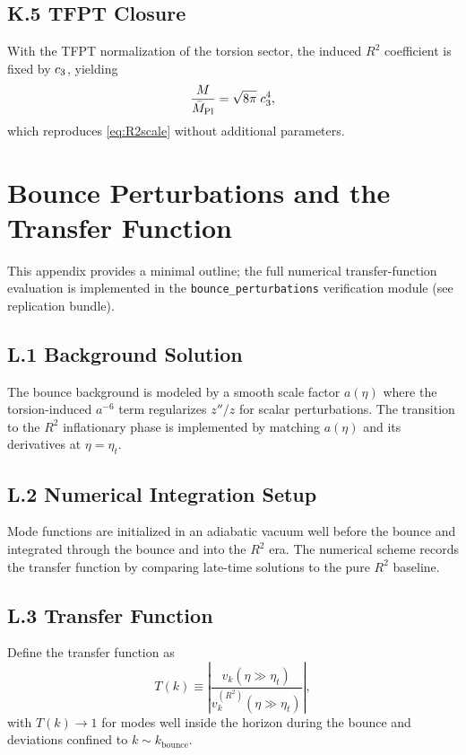 \subsection{K.5 TFPT Closure}
With the TFPT normalization of the torsion sector, the induced $R^2$ coefficient is fixed by
$c_3$, yielding
\begin{equation}
    \frac{M}{\bar{M}_{\mathrm{Pl}}}=\sqrt{8\pi}\;c_3^4,
\end{equation}
which reproduces \eqref{eq:R2scale} without additional parameters.

\section{Bounce Perturbations and the Transfer Function}
\label{app:bounce}

\begin{tcolorbox}[colback=gray!5, colframe=gray!60, 
    title={\textbf{Status Note}}, fonttitle=\bfseries\small]
This appendix provides a minimal outline; the full numerical transfer-function evaluation
is implemented in the \texttt{bounce\_perturbations} verification module (see replication bundle).
\end{tcolorbox}

\subsection{L.1 Background Solution}
The bounce background is modeled by a smooth scale factor $a(\eta)$ where the torsion-induced
$a^{-6}$ term regularizes $z''/z$ for scalar perturbations. The transition to the $R^2$
inflationary phase is implemented by matching $a(\eta)$ and its derivatives at $\eta=\eta_t$.

\subsection{L.2 Numerical Integration Setup}
Mode functions are initialized in an adiabatic vacuum well before the bounce and integrated
through the bounce and into the $R^2$ era. The numerical scheme records the transfer function
by comparing late-time solutions to the pure $R^2$ baseline.

\subsection{L.3 Transfer Function}
Define the transfer function as
\begin{equation}
    T(k) \equiv \left|\frac{v_k(\eta\gg \eta_t)}{v_k^{(R^2)}(\eta\gg \eta_t)}\right|,
\end{equation}
with $T(k)\to 1$ for modes well inside the horizon during the bounce and deviations confined
to $k\sim k_{\text{bounce}}$.

